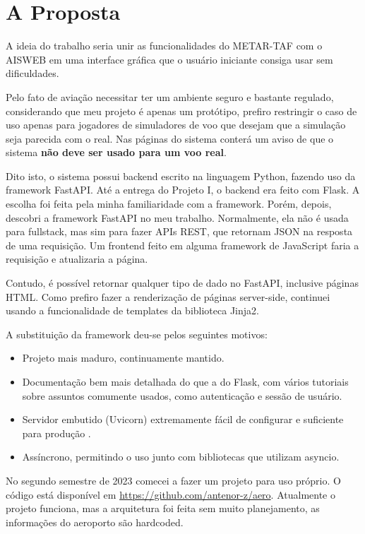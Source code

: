 \chapter{A Proposta}
A ideia do trabalho seria unir as funcionalidades do METAR-TAF com o AISWEB
em uma interface gráfica que o usuário iniciante consiga usar sem dificuldades.

Pelo fato de aviação necessitar ter um ambiente seguro e bastante regulado, considerando
que meu projeto é apenas um protótipo, prefiro restringir o caso de uso apenas
para jogadores de simuladores de voo que desejam que a simulação seja parecida
com o real. Nas páginas do sistema conterá um aviso de que o sistema \textbf{não
deve ser usado para um voo real}.

Dito isto, o sistema possui backend escrito na linguagem Python, fazendo uso da 
framework FastAPI. Até a entrega do Projeto I, o backend era feito com Flask. 
A escolha foi feita pela minha familiaridade com a framework. Porém, depois, 
descobri a framework FastAPI no meu trabalho. Normalmente, ela não é usada para fullstack, mas 
sim para fazer APIs REST, que retornam JSON na resposta de uma requisição. Um 
frontend feito em alguma framework de JavaScript faria a requisição e atualizaria a página.

Contudo, é possível retornar qualquer tipo de dado no FastAPI, inclusive páginas HTML. 
Como prefiro fazer a renderização de páginas server-side, continuei usando a funcionalidade 
de templates da biblioteca Jinja2.

A substituição da framework deu-se pelos seguintes motivos:

\begin{itemize}
\item Projeto mais maduro, continuamente mantido.
\item Documentação bem mais detalhada do que a do Flask, com vários tutoriais sobre assuntos comumente usados, como autenticação e sessão de usuário.
\item Servidor embutido (Uvicorn) extremamente fácil de configurar e suficiente para produção \cite{fast-api-prod}.
\item Assíncrono, permitindo o uso junto com bibliotecas que utilizam asyncio.
\end{itemize}

No segundo semestre de 2023 comecei a fazer um projeto para uso próprio.
O código está disponível em \url{https://github.com/antenor-z/aero}. Atualmente o
projeto funciona, mas a arquitetura foi feita sem muito planejamento, as
informações do aeroporto são hardcoded.

